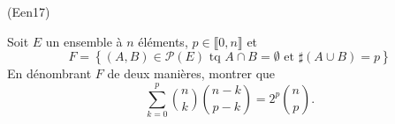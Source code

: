 \begin{tiny}(Een17)\end{tiny} Soit $E$ un ensemble à $n$ éléments, $p\in \llbracket 0,n\rrbracket$  et 
\[
 F = \left\lbrace (A,B)\in \mathcal{P}(E) \text{ tq } A\cap B = \emptyset \text{ et } \sharp(A\cup B) = p\right\rbrace 
\]
En dénombrant $F$ de deux manières, montrer que
\[
 \sum_{k=0}^{p}\binom{n}{k}\binom{n-k}{p-k} = 2^p \binom{n}{p}.
\]
